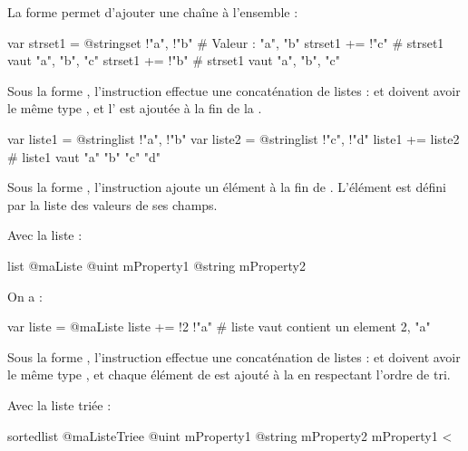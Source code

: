 La forme  permet d'ajouter une chaîne à l'ensemble :
\begin{galgascode}
var strset1 = @stringset {!"a", !"b"} # Valeur : "a", "b"
strset1 += !"c" # strset1 vaut "a", "b", "c"
strset1 += !"b" # strset1 vaut "a", "b", "c"
\end{galgascode}




Sous la forme , l'instruction effectue une concaténation de listes :  et  doivent avoir le même type , et l' est ajoutée à la fin de la .

\begin{galgascode}
var liste1 = @stringlist {!"a", !"b"}
var liste2 = @stringlist {!"c", !"d"}
liste1 += liste2 # liste1 vaut "a" "b" "c" "d"
\end{galgascode}



Sous la forme , l'instruction ajoute un élément à la fin de . L'élément est défini par la liste des valeurs de ses champs.

Avec la liste :
\begin{galgascode}
list @maListe {
  @uint mProperty1
  @string mProperty2
}
\end{galgascode}

On a :

\begin{galgascode}
var liste = @maListe {}
liste += !2 !"a" # liste vaut contient un element 2, "a"
\end{galgascode}







Sous la forme , l'instruction effectue une concaténation de listes :  et  doivent avoir le même type , et chaque élément de  est ajouté à la  en respectant l'ordre de tri.

Avec la liste triée :
\begin{galgascode}
sortedlist @maListeTriee {
  @uint mProperty1
  @string mProperty2
}{
  mProperty1 <
}
\end{galgascode}

